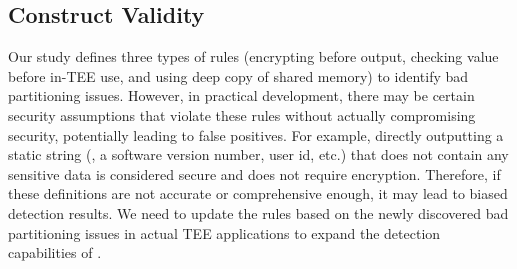 \subsection{Construct Validity}
Our study defines three types of rules (encrypting before output, checking value before in-TEE use, and using deep copy of shared memory) to identify bad partitioning issues.
However, in practical development, there may be certain security assumptions that violate these rules without actually compromising security, potentially leading to false positives.
For example, directly outputting a static string (\eg, a software version number, user id, etc.) that does not contain any sensitive data is considered secure and does not require encryption.
Therefore, if these definitions are not accurate or comprehensive enough, it may lead to biased detection results.
We need to update the rules based on the newly discovered bad partitioning issues in actual TEE applications to expand the detection capabilities of \ccSysName.
